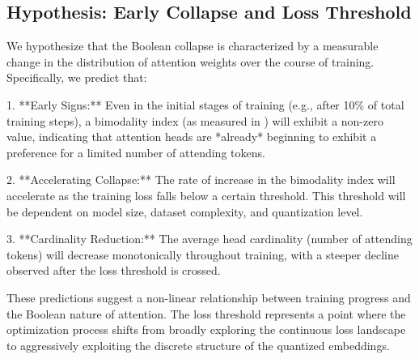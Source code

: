 \subsection{Hypothesis: Early Collapse and Loss Threshold}













We hypothesize that the Boolean collapse is characterized by a measurable change in the distribution of attention weights over the course of training. Specifically, we predict that:













1.  **Early Signs:** Even in the initial stages of training (e.g., after 10\% of total training steps), a bimodality index (as measured in \cite{mimo2024empirical}) will exhibit a non-zero value, indicating that attention heads are *already* beginning to exhibit a preference for a limited number of attending tokens.






2.  **Accelerating Collapse:** The rate of increase in the bimodality index will accelerate as the training loss falls below a certain threshold. This threshold will be dependent on model size, dataset complexity, and quantization level.






3.  **Cardinality Reduction:** The average head cardinality (number of attending tokens) will decrease monotonically throughout training, with a steeper decline observed after the loss threshold is crossed.













These predictions suggest a non-linear relationship between training progress and the Boolean nature of attention.  The loss threshold represents a point where the optimization process shifts from broadly exploring the continuous loss landscape to aggressively exploiting the discrete structure of the quantized embeddings.













